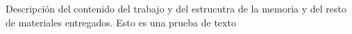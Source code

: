 
Descripción del contenido del trabajo y del estrucutra de la memoria y del resto de materiales entregados.
Esto es una prueba de texto

